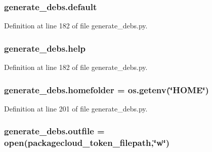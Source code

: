 \subsubsection[{\texorpdfstring{default}{default}}]{\setlength{\rightskip}{0pt plus 5cm}generate\+\_\+debs.\+default}\hypertarget{namespacegenerate__debs_a3d67a92b7eb3a59c397dc9fdd1c67558}{}\label{namespacegenerate__debs_a3d67a92b7eb3a59c397dc9fdd1c67558}


Definition at line 182 of file generate\+\_\+debs.\+py.

\subsubsection[{\texorpdfstring{help}{help}}]{\setlength{\rightskip}{0pt plus 5cm}generate\+\_\+debs.\+help}\hypertarget{namespacegenerate__debs_ab09f4294da5036d5f6881672de9ed9c7}{}\label{namespacegenerate__debs_ab09f4294da5036d5f6881672de9ed9c7}


Definition at line 182 of file generate\+\_\+debs.\+py.

\subsubsection[{\texorpdfstring{homefolder}{homefolder}}]{\setlength{\rightskip}{0pt plus 5cm}generate\+\_\+debs.\+homefolder = os.\+getenv(\char`\"{}H\+O\+ME\char`\"{})}\hypertarget{namespacegenerate__debs_aeb83979be2939a8059435a906a91f682}{}\label{namespacegenerate__debs_aeb83979be2939a8059435a906a91f682}


Definition at line 201 of file generate\+\_\+debs.\+py.

\subsubsection[{\texorpdfstring{outfile}{outfile}}]{\setlength{\rightskip}{0pt plus 5cm}generate\+\_\+debs.\+outfile = open({\bf packagecloud\+\_\+token\+\_\+filepath},\char`\"{}w\char`\"{})}\hypertarget{namespacegenerate__debs_aa1faa039b35b72ee44dc6f106ad12911}{}\label{namespacegenerate__debs_aa1faa039b35b72ee44dc6f106ad12911}


